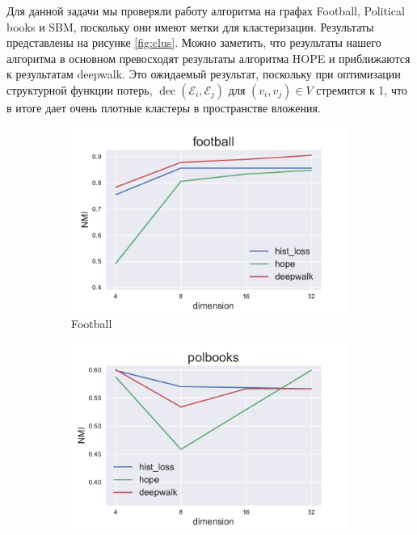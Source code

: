 \documentclass[12pt,a4paper]{extarticle}
\newcommand{\E}{\mathcal{E}}
\newcommand{\decoder}{\operatorname{dec}}
\begin{document}
    Для данной задачи мы проверяли работу алгоритма на графах Football, Political books и SBM, поскольку они имеют метки для кластеризации.
    Результаты представлены на рисунке \ref{fig:clus}.
    Можно заметить, что результаты нашего алгоритма в основном превосходят результаты алгоритма HOPE и приближаются к результатам deepwalk.
    Это ожидаемый результат, поскольку при оптимизации структурной функции потерь, $\decoder(\E_i, \E_j)$ для $(v_i, v_j) \in V$ стремится к 1, что в итоге дает очень плотные кластеры в пространстве вложения.
    
    \begin{figure}
    \begin{subfigure}{.5\linewidth}
    \centering
    \includegraphics[width=\linewidth]{src/images/Node_clusterization_football.pdf}
    \caption{Football}
    \label{fig:clus_foot}
    \end{subfigure}
    \begin{subfigure}{.5\linewidth}
    \centering
    \includegraphics[width=\linewidth]{src/images/Node_clusterization_polbooks.pdf}

\end{subfigure}
\end{figure}
\end{document}
